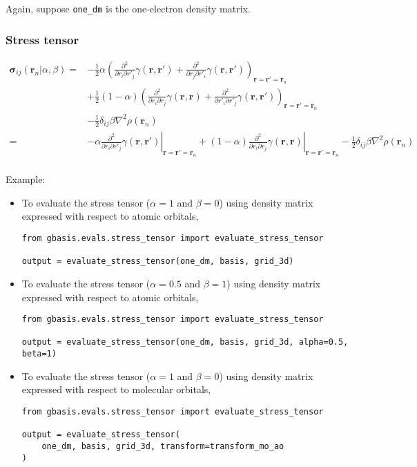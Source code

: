 \documentclass[letterpaper]{article}
\begin{document}
Again, suppose \verb|one_dm| is the one-electron density matrix.
\subsubsection{Stress tensor}
\begin{equation}
  \begin{split}
    \boldsymbol{\sigma}_{ij}(\mathbf{r}_n | \alpha, \beta)
    =&
    -\frac{1}{2} \alpha
    \left(
      \frac{\partial^2}{\partial r_i \partial r'_j} \gamma(\mathbf{r}, \mathbf{r}')
      + \frac{\partial^2}{\partial r_j \partial r'_i} \gamma(\mathbf{r}, \mathbf{r}')
    \right)_{\mathbf{r} = \mathbf{r}' = \mathbf{r}_n}\\
    & +\frac{1}{2} (1 - \alpha)
    \left(
      \frac{\partial^2}{\partial r_i \partial r_j} \gamma(\mathbf{r}, \mathbf{r})
      + \frac{\partial^2}{\partial r'_i \partial r'_j} \gamma(\mathbf{r}, \mathbf{r}')
    \right)_{\mathbf{r} = \mathbf{r}' = \mathbf{r}_n}\\
    & - \frac{1}{2} \delta_{ij} \beta \nabla^2 \rho(\mathbf{r}_n)\\
    =&
    - \alpha
    \left.
      \frac{\partial^2}{\partial r_i \partial r'_j} \gamma(\mathbf{r}, \mathbf{r}')
    \right|_{\mathbf{r} = \mathbf{r}' = \mathbf{r}_n}
    + (1 - \alpha)
    \left.
      \frac{\partial^2}{\partial r_i \partial r_j} \gamma(\mathbf{r}, \mathbf{r})
    \right|_{\mathbf{r} = \mathbf{r}' = \mathbf{r}_n}
    - \frac{1}{2} \delta_{ij} \beta \nabla^2 \rho(\mathbf{r}_n)\\
  \end{split}
\end{equation}

Example:
\begin{itemize}
\item To evaluate the stress tensor ($\alpha=1$ and $\beta=0$)
  using density matrix expressed with respect to atomic orbitals,
  \begin{lstlisting}[xleftmargin=-25pt]
from gbasis.evals.stress_tensor import evaluate_stress_tensor

output = evaluate_stress_tensor(one_dm, basis, grid_3d)
\end{lstlisting}
\item To evaluate the stress tensor ($\alpha=0.5$ and $\beta=1$)
  using density matrix expressed with respect to atomic orbitals,
  \begin{lstlisting}[xleftmargin=-25pt]
from gbasis.evals.stress_tensor import evaluate_stress_tensor

output = evaluate_stress_tensor(one_dm, basis, grid_3d, alpha=0.5, beta=1)
\end{lstlisting}
\item To evaluate the stress tensor ($\alpha=1$ and $\beta=0$)
  using density matrix expressed with respect to molecular orbitals,
  \begin{lstlisting}[xleftmargin=-25pt]
from gbasis.evals.stress_tensor import evaluate_stress_tensor

output = evaluate_stress_tensor(
    one_dm, basis, grid_3d, transform=transform_mo_ao
)
\end{lstlisting}
\end{itemize}
\end{document}
